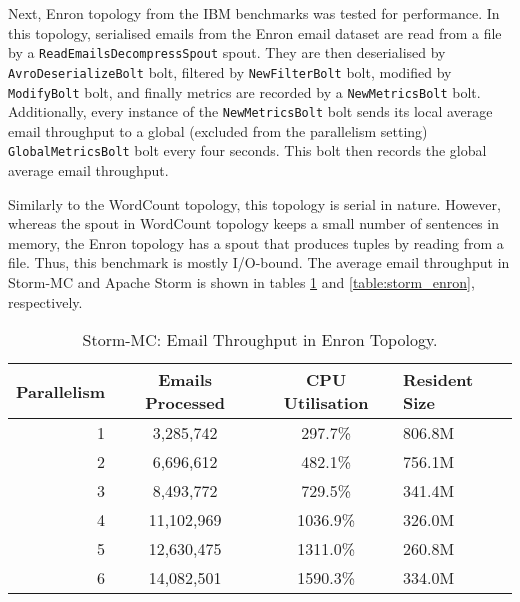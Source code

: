 Next, Enron topology from the IBM benchmarks was tested for performance. In this topology, serialised emails from the Enron email dataset are read from a file by a \texttt{ReadEmailsDecompressSpout} spout. They are then deserialised by \texttt{AvroDeserializeBolt} bolt, filtered by \texttt{NewFilterBolt} bolt, modified by \texttt{ModifyBolt} bolt, and finally metrics are recorded by a \texttt{NewMetricsBolt} bolt. Additionally, every instance of the \texttt{NewMetricsBolt} bolt sends its local average email throughput to a global (excluded from the parallelism setting) \texttt{GlobalMetricsBolt} bolt every four seconds. This bolt then records the global average email throughput.

Similarly to the WordCount topology, this topology is serial in nature. However, whereas the spout in  WordCount topology keeps a small number of sentences in memory, the Enron topology has a spout that produces tuples by reading from a file. Thus, this benchmark is mostly I/O-bound. The average email throughput in Storm-MC and Apache Storm is shown in tables \ref{table:storm_mc_enron} and \ref{table:storm_enron}, respectively. 

\begin{table}[!htb]
\begin{adjustwidth}{-0.5in}{-0.5in}
\centering
\small
\begin{tabular}{@{}rccl@{}}
    \textbf{Parallelism} & \textbf{Emails Processed} & \textbf{CPU Utilisation} & \textbf{Resident Size} \\ \toprule
    1 & {3,285,742} & {297.7\%} & {806.8M} \\
    2 & {6,696,612} & {482.1\%} & {756.1M} \\
    3 & {8,493,772} & {729.5\%} & {341.4M} \\
    4 & {11,102,969} & {1036.9\%} & {326.0M} \\
    5 & {12,630,475} & {1311.0\%} & {260.8M} \\
    6 & {14,082,501} & {1590.3\%} & {334.0M} \\
\end{tabular}
\caption{Storm-MC: Email Throughput in Enron Topology.}
\label{table:storm_mc_enron}
\end{adjustwidth}
\end{table}

